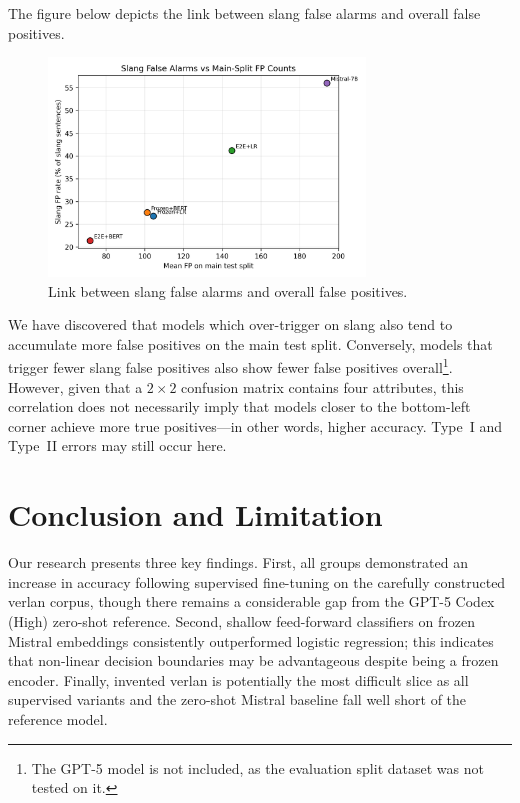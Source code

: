 \documentclass[12pt]{article}
\begin{document}
The figure below depicts the link between slang false alarms and overall false positives.

\begin{figure}[H]
    \centering
    \includegraphics[width=0.75\textwidth]{figures/slang_fp_vs_main_fp.png}
    \caption{Link between slang false alarms and overall false positives.}
    \label{fig:slang-fp-correlation}
\end{figure}

We have discovered that models which over-trigger on slang also tend to accumulate more false positives on the main test split. 
Conversely, models that trigger fewer slang false positives also show fewer false positives overall\footnote{The GPT-5 model is not included, as the evaluation split dataset was not tested on it.}. 
However, given that a $2 \times 2$ confusion matrix contains four attributes, this correlation does not necessarily imply that models closer to the bottom-left corner achieve more true positives\;---\;in other words, higher accuracy. 
Type~I and Type~II errors may still occur here.

\section{Conclusion and Limitation}

Our research presents three key findings. First, all groups demonstrated an increase in accuracy following supervised fine-tuning on the carefully constructed verlan corpus, though there remains a considerable gap from the GPT-5 Codex (High) zero-shot reference. Second, shallow feed-forward classifiers on frozen Mistral embeddings consistently outperformed logistic regression; this indicates that non-linear decision boundaries may be advantageous despite being a frozen encoder. Finally, invented verlan is potentially the most difficult slice as all supervised variants and the zero-shot Mistral baseline fall well short of the reference model.
\end{document}
